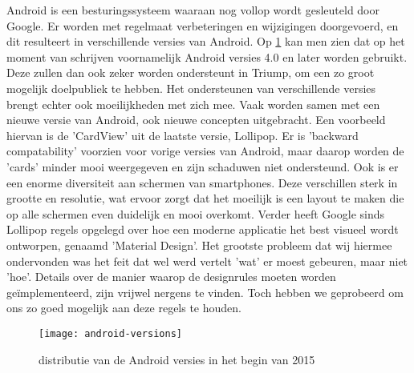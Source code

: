 Android is een besturingssysteem waaraan nog vollop wordt gesleuteld door Google. Er worden met regelmaat verbeteringen en wijzigingen doorgevoerd, en dit resulteert in verschillende versies van Android.
Op \ref{fig:android_versions} kan men zien dat op het moment van schrijven voornamelijk Android versies 4.0 en later worden gebruikt. Deze zullen dan ook zeker worden ondersteunt in Triump, om een zo groot mogelijk doelpubliek te hebben. Het ondersteunen van verschillende versies brengt echter ook moeilijkheden met zich mee. Vaak worden samen met een nieuwe versie van Android, ook nieuwe concepten uitgebracht.
Een voorbeeld hiervan is de 'CardView' uit de laatste versie, Lollipop. Er is 'backward compatability' voorzien voor vorige versies van Android, maar daarop worden de 'cards' minder mooi weergegeven en zijn schaduwen niet ondersteund.
Ook is er een enorme diversiteit aan schermen van smartphones. Deze verschillen sterk in grootte en resolutie, wat ervoor zorgt dat het moeilijk is een layout te maken die op alle schermen even duidelijk en mooi overkomt.
Verder heeft Google sinds Lollipop regels opgelegd over hoe een moderne applicatie het best visueel wordt ontworpen, genaamd 'Material Design'. Het grootste probleem dat wij hiermee ondervonden was het feit dat wel werd vertelt 'wat' er moest gebeuren, maar niet 'hoe'. Details over de manier waarop de designrules moeten worden geïmplementeerd, zijn vrijwel nergens te vinden. Toch hebben we geprobeerd om ons zo goed mogelijk aan deze regels te houden.
\begin{figure}[H]
	\centering
	\texttt{[image: android-versions]}
	\caption{distributie van de Android versies in het begin van 2015}
	\label{fig:android_versions}
\end{figure}




